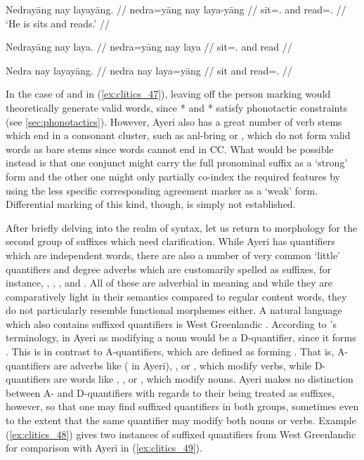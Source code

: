 \pex\label{ex:clitics_47}
\a\label{ex:clitics_47a}\begingl
	\gla Nedrayāng nay layayāng. //
	\glb nedra=yāng nay laya-yāng //
	\glc sit=\TsgM{}.\Aarg{} and read=\TsgM{}.\Aarg{} //
	\glft `He is sits and reads.' //
\endgl

\a\label{ex:clitics_47b}\ljudge{*}\begingl
	\gla Nedrayāng nay laya. //
	\glb nedra=yāng nay laya //
	\glc sit=\TsgM{}.\Aarg{} and read //
\endgl

\a\label{ex:clitics_47c}\ljudge{*}\begingl
	\gla Nedra nay layayāng. //
	\glb nedra nay laya=yāng //
	\glc sit and read=\TsgM{}.\Aarg{} //
\endgl
\xe

In the case of  and  in
(\ref{ex:clitics_47}), leaving off the person marking would theoretically
generate valid words, since * and * satisfy
phonotactic constraints (see \autoref{sec:phonotactics}). However, Ayeri also
has a great number of verb stems which end in a consonant cluster, such as
 {anl-}{bring} or , which do not form valid
words as bare stems since words cannot end in CC. What would be possible
instead is that one conjunct might carry the full pronominal suffix as a
`strong' form and the other one might only partially co-index the required
features by using the less specific corresponding agreement marker as a `weak'
form. Differential marking of this kind, though, is simply not established.

\label{clitics_quant}
After briefly delving into the realm of syntax, let us return to morphology for
the second group of suffixes which need clarification. While Ayeri has
quantifiers which are independent words, there are also a number of very common
`little' quantifiers and degree adverbs which are customarily spelled as
suffixes, for instance, ,
, , and
. All of these are adverbial in meaning and while they
are comparatively light in their semantics compared to regular content words,
they do not particularly resemble functional morphemes either. A natural
language which also contains suffixed quantifiers is West Greenlandic
\citep{bittner1995}. According to \citet{bittner1995}'s terminology,
 in Ayeri as modifying a noun would be a D-quantifier, since
it forms .
This is in contrast to A-quantifiers, which are defined as forming
. That is,
A-quantifiers are adverbs like  ( in Ayeri),
, or , which modify verbs, while D-quantifiers are words
like , , or , which modify nouns. Ayeri makes no
distinction between A- and D-quantifiers with regards to their being treated as
suffixes, however, so that one may find suffixed quantifiers in both groups,
sometimes even to the extent that the same quantifier may modify both nouns or
verbs. Example (\ref{ex:clitics_48}) gives two instances of suffixed
quantifiers from West Greenlandic for comparison with Ayeri in
(\ref{ex:clitics_49}).

